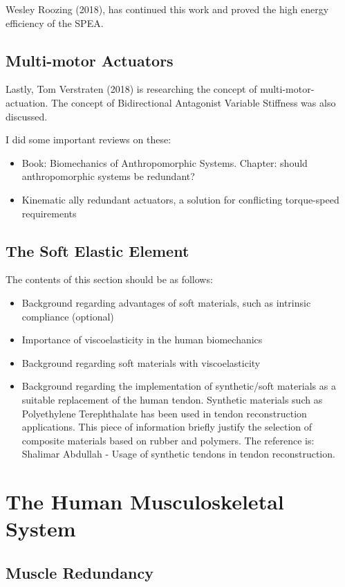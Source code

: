 Wesley Roozing (2018), has continued this work and proved the high energy efficiency of the SPEA.

\subsection{Multi-motor Actuators}

Lastly, Tom Verstraten (2018) is researching the concept of multi-motor-actuation. The concept of Bidirectional Antagonist Variable Stiffness was also discussed.

I did some important reviews on these:
\begin{itemize}
    \item Book: Biomechanics of Anthropomorphic Systems. Chapter:  should anthropomorphic systems be redundant?
    \item Kinematic ally redundant actuators, a solution for conflicting torque-speed requirements
\end{itemize}

\subsection{The Soft Elastic Element}
The contents of this section should be as follows:
\begin{itemize}
    \item Background regarding advantages of soft materials, such as intrinsic compliance (optional)
    \item Importance of viscoelasticity in the human biomechanics
    \item Background regarding soft materials with viscoelasticity
    \item Background regarding the implementation of synthetic/soft materials as a suitable replacement of the human tendon. Synthetic materials such as Polyethylene Terephthalate has been used in tendon reconstruction applications. This piece of information briefly justify the selection of composite materials based on rubber and polymers. The reference is: Shalimar Abdullah - Usage of synthetic tendons in tendon reconstruction.
\end{itemize}

\section{The Human Musculoskeletal System}

\subsection{Muscle Redundancy}

